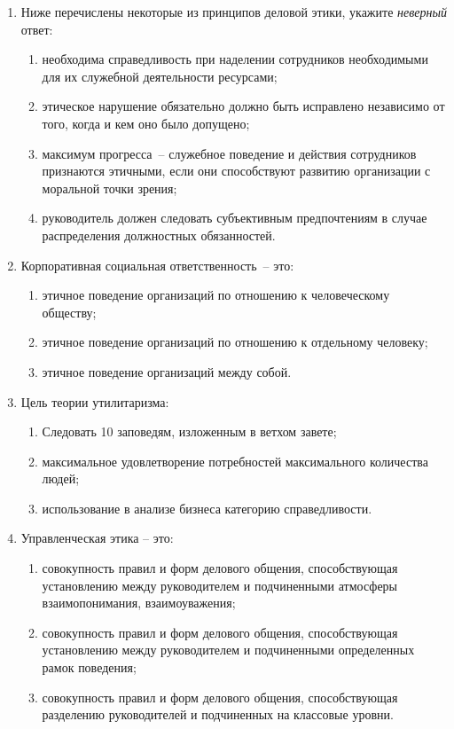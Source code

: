 \documentclass[12pt,pscyr]{hedwork}
\renewcommand{\labelenumii}{\asbuk{enumii})}
\newcommand{\itempo}{\stepcounter{enumii}\item[\bfseries\labelenumii]}
\begin{document}
\begin{enumerate}
    \item Ниже перечислены некоторые из принципов деловой этики, укажите
      \emph{неверный} ответ:
      \begin{enumerate}
        \item необходима справедливость при наделении сотрудников необходимыми
          для их служебной деятельности ресурсами;
        \item этическое нарушение обязательно должно быть исправлено независимо
          от того, когда и кем оно было допущено;
        \item максимум прогресса~-- служебное поведение и действия сотрудников
          признаются этичными, если они способствуют развитию организации с
          моральной точки зрения;
        \itempo руководитель должен следовать субъективным предпочтениям
          в случае распределения должностных обязанностей.
      \end{enumerate}

    \item Корпоративная социальная ответственность~-- это:
      \begin{enumerate}
        \itempo этичное поведение организаций по отношению к человеческому
          обществу;
        \item этичное поведение организаций по отношению к отдельному
          человеку;
        \item этичное поведение организаций между собой.
      \end{enumerate}

    \newpage
    \item Цель теории утилитаризма:
      \begin{enumerate}
        \item Следовать 10 заповедям, изложенным в ветхом завете;
        \itempo максимальное удовлетворение потребностей максимального
          количества людей;
        \item использование в анализе бизнеса категорию справедливости.
      \end{enumerate}

    \item Управленческая этика -- это:
      \begin{enumerate}
        \itempo совокупность правил и форм делового общения, способствующая
          установлению между руководителем и подчиненными атмосферы
          взаимопонимания, взаимоуважения;
        \item совокупность правил и форм делового общения, способствующая
          установлению между руководителем и подчиненными определенных рамок
          поведения;
        \item совокупность правил и форм делового общения, способствующая
          разделению руководителей и подчиненных на классовые уровни.
      \end{enumerate}


\end{enumerate}
\end{document}
